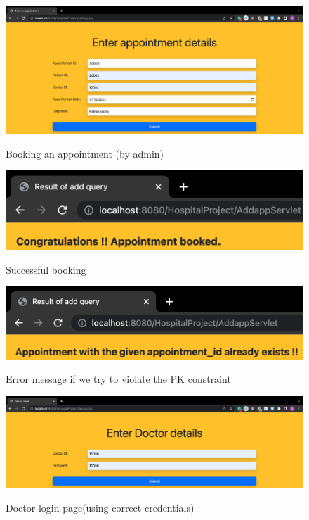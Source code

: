 \documentclass[12pt]{article}
\begin{document}
\newpage

\begin{figure}[!hbt]
    \centering
    \includegraphics[scale=0.35]{screenshots/2o.png}
    \label{fig:data}
    \caption{Booking an appointment (by admin)}
\end{figure}

\begin{figure}[!hbt]
    \centering
    \includegraphics[scale=0.9]{screenshots/2p.png}
    \label{fig:my_label1}
    \caption{Successful booking}
\end{figure}

\begin{figure}[!hbt]
    \centering
    \includegraphics[scale=0.9]{screenshots/2q.png}
    \label{fig:data}
    \caption{Error message if we try to violate the PK constraint}
\end{figure}

\newpage

\begin{figure}[!hbt]
    \centering
    \includegraphics[scale=0.35]{screenshots/3a.png}
    \label{fig:my_label1}
    \caption{Doctor login page(using correct credentials)}
\end{figure}
\end{document}
